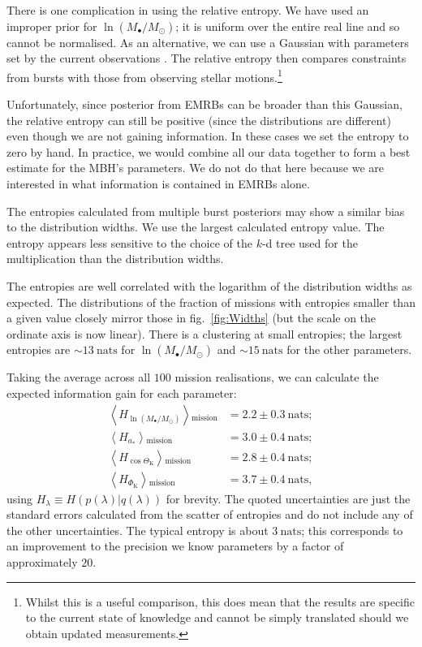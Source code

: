 \documentclass[useAMS,usedcolumn,usegraphicx,usenatbib]{mn2e}
\newcommand{\figref}[1]{fig.~\ref{fig:#1}}
\newcommand{\units}[1]{\ensuremath{~\mathrm{#1}}}
\newcommand{\sub}[1]{\ensuremath{_\mathrm{#1}}}
\begin{document}
There is one complication in using the relative entropy. We have used an improper prior for $\ln (M_\bullet/M_\odot)$; it is uniform over the entire real line and so cannot be normalised. As an alternative, we can use a Gaussian with parameters set by the current observations \citep{Gillessen2009}. The relative entropy then compares constraints from bursts with those from observing stellar motions.\footnote{Whilst this is a useful comparison, this does mean that the results are specific to the current state of knowledge and cannot be simply translated should we obtain updated measurements.}

Unfortunately, since posterior from EMRBs can be broader than this Gaussian, the relative entropy can still be positive (since the distributions are different) even though we are not gaining information. In these cases we set the entropy to zero by hand. In practice, we would combine all our data together to form a best estimate for the MBH's parameters. We do not do that here because we are interested in what information is contained in EMRBs alone.

The entropies calculated from multiple burst posteriors may show a similar bias to the distribution widths. We use the largest calculated entropy value. The entropy appears less sensitive to the choice of the $k$-d tree used for the multiplication than the distribution widths.

The entropies are well correlated with the logarithm of the distribution widths as expected. The distributions of the fraction of missions with entropies smaller than a given value closely mirror those in \figref{Widths} (but the scale on the ordinate axis is now linear). There is a clustering at small entropies; the largest entropies are $\sim 13\units{nats}$ for $\ln(M_\bullet/M_\odot)$ and $\sim 15\units{nats}$ for the other parameters.

Taking the average across all $100$ mission realisations, we can calculate the expected information gain for each parameter:
\begin{equation}
\begin{split}
\left\langle H_{\ln(M_\bullet/M_\odot)}\right\rangle\sub{mission} & = 2.2 \pm 0.3 \units{nats}; \\
\left\langle H_{a_\ast}\right\rangle\sub{mission} & = 3.0 \pm 0.4 \units{nats}; \\
\left\langle H_{\cos\Theta\sub{K}}\right\rangle\sub{mission} & = 2.8 \pm 0.4 \units{nats}; \\
\left\langle H_{\Phi\sub{K}}\right\rangle\sub{mission} & = 3.7 \pm 0.4 \units{nats},
\end{split}
\end{equation}
using $H_\lambda \equiv H(p(\lambda)|q(\lambda))$ for brevity. The quoted uncertainties are just the standard errors calculated from the scatter of entropies and do not include any of the other uncertainties. The typical entropy is about $3 \units{nats}$; this corresponds to an improvement to the precision we know parameters by a factor of approximately $20$.
\end{document}
